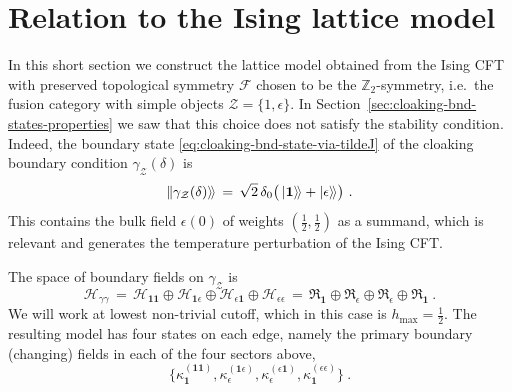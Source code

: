 \documentclass[11pt,a4paper]{article}
\numberwithin{equation}{section}
\def\ket#1{|{#1}\rangle}
\newcommand{\bndstate}[1]{|\hspace{-1pt}\ket{#1}\!\rangle}
\newcommand{\one}{\mathbf{1}} %
\begin{document}
\section{Relation to the Ising lattice model}\label{sec:Ising-lattice}

In this short section we construct the lattice model obtained from the Ising CFT with preserved topological symmetry $\mathcal{F}$ chosen to be the $\mathbb{Z}_2$-symmetry, i.e.\ the fusion category with simple objects $\mathcal{Z} = \{ 1, \epsilon \}$. In Section~\ref{sec:cloaking-bnd-states-properties} we saw that this choice does not satisfy the stability condition. Indeed, the boundary state \eqref{eq:cloaking-bnd-state-via-tildeJ} of the cloaking boundary condition $\gamma_{\mathcal{Z}}(\delta)$ is 
\begin{equation}
    \bndstate{\gamma_{\mathcal{Z}}(\delta)} 
\,=\,
\sqrt2 \, \delta_0  \big(  \,
\ket{\one}\!\rangle + \ket{\epsilon}\!\rangle \big) \ .
\end{equation}
This contains the bulk field $\epsilon(0)$ of weights $(\frac12,\frac12)$ as a summand, which is relevant and generates the temperature perturbation of the Ising CFT.

The space of boundary fields on $\gamma_{\mathcal{Z}}$ is
\begin{equation}
	\mathcal{H}_{\gamma\gamma} 
 \,=\, 
 \mathcal{H}_{\one\one} \oplus \mathcal{H}_{\one\epsilon} \oplus \mathcal{H}_{\epsilon\one} \oplus \mathcal{H}_{\epsilon\epsilon}
 \,=\, 
 \mathfrak{R}_\one \oplus \mathfrak{R}_\epsilon \oplus \mathfrak{R}_\epsilon \oplus \mathfrak{R}_\one 
 \ .
\end{equation}
We will work at lowest non-trivial cutoff, which in this case is $h_\text{max} = \frac12$. 
The resulting model has four states on each edge, namely the primary boundary (changing) fields in each of the four sectors above,
\begin{equation}\label{eq:Ising-lattice-4-states}
    \{ \kappa^{(\one\one)}_\one ,  \kappa^{(\one\epsilon)}_\epsilon ,  \kappa^{(\epsilon\one)}_\epsilon ,  \kappa^{(\epsilon\epsilon)}_\one   \} \ .
\end{equation}
\end{document}
